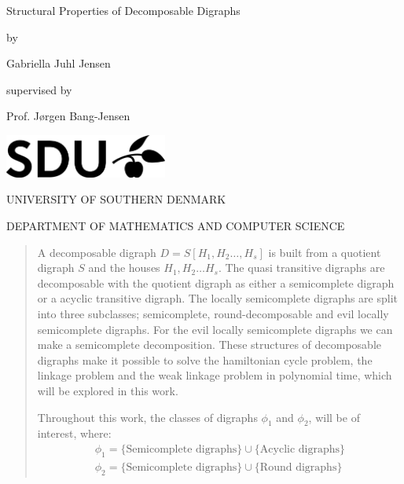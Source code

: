\documentclass[11pt,oneside,a4paper]{report}
\begin{document}
\begin{titlepage}
	\begin{center}
		\vspace*{1cm}
		\huge{Structural Properties of Decomposable Digraphs}
		
		\vspace*{0.5cm}
		\large{by}
		
		\vspace{0.5cm}
		\Large{Gabriella Juhl Jensen}
		
		\vspace*{0.5cm}
		\normalsize{supervised by}
		
		\vspace{0.5cm}
		\large{Prof. Jørgen Bang-Jensen}
		
		\vfill
		
		\vspace*{0.7cm}
		\includegraphics[width=0.4\textwidth]{sdulogo}
		
		\vspace*{1cm}
		\MakeUppercase{University of southern Denmark}
		
		\vspace*{0.3cm}
		\MakeUppercase{Department of mathematics and computer science}
		
		\vspace*{0.3cm}
		\large{}
	\end{center}
\end{titlepage}
\begin{abstract}
	A decomposable digraph $D = S[H_1, H_2 \dots , H_s]$ is built from a quotient digraph $S$ and the houses $H_1, H_2 \dots H_s$.
	The quasi transitive digraphs are decomposable with the quotient digraph as either a semicomplete digraph or a acyclic transitive digraph.
	The locally semicomplete digraphs are split into three subclasses; semicomplete, round-decomposable and evil locally semicomplete digraphs.
	For the evil locally semicomplete digraphs we can make a semicomplete decomposition.
	These structures of decomposable digraphs make it possible to solve the hamiltonian cycle problem, the linkage problem and the weak linkage problem in polynomial time, which will be explored in this work.
	
	Throughout this work, the classes of digraphs $\phi_1$ and $\phi_2$, will be of interest, where:
	\begin{align}
		\phi_1=\lbrace \text{Semicomplete digraphs}\rbrace\cup \lbrace \text{Acyclic digraphs}\rbrace\\
		\phi_2=\lbrace \text{Semicomplete digraphs}\rbrace\cup \lbrace \text{Round digraphs}\rbrace
	\end{align}
\end{abstract}
\tableofcontents
	\clearpage
\end{document}
